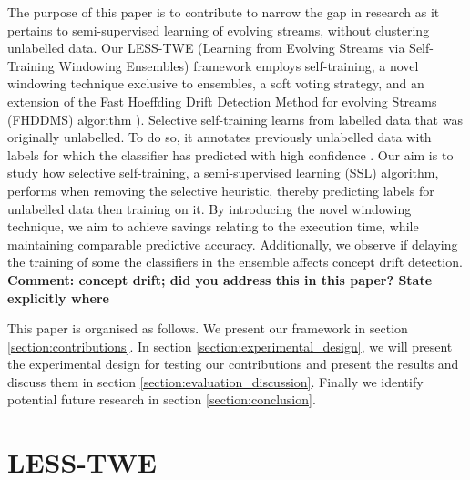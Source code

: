 \documentclass[runningheads]{llncs}
\begin{document}
The purpose of this paper is to contribute to narrow the gap in research as it pertains to semi-supervised learning of evolving streams, without clustering unlabelled data.
Our LESS-TWE (Learning from Evolving Streams via Self-Training Windowing Ensembles) framework employs self-training, a novel windowing technique exclusive to ensembles, a soft voting strategy, and an extension of the Fast Hoeffding Drift Detection Method for evolving Streams (FHDDMS) algorithm \cite{pesaranghader2018reservoir}).
Selective self-training learns from labelled data that was originally unlabelled. To do so, it annotates previously unlabelled data with labels for which the classifier has predicted with high confidence \cite{zhu2009selftraining}. Our aim is to study how selective self-training, a semi-supervised learning (SSL) algorithm, performs when removing the selective heuristic, thereby predicting labels for unlabelled data then training on it.  
By introducing the novel windowing technique, we aim to achieve savings relating to the execution time, while maintaining comparable predictive accuracy. Additionally, we observe if delaying the training of some the classifiers in the ensemble affects concept drift detection. {\bf {Comment: concept drift; did you address this in this paper? State explicitly where}}




This paper is organised as follows.  We present our framework in section \ref{section:contributions}.  In section \ref{section:experimental_design}, we will present the experimental design for testing our contributions and present the results and discuss them in section \ref{section:evaluation_discussion}. Finally we identify potential future research in section \ref{section:conclusion}.

\section{LESS-TWE\label{section:contributions}}
\end{document}
